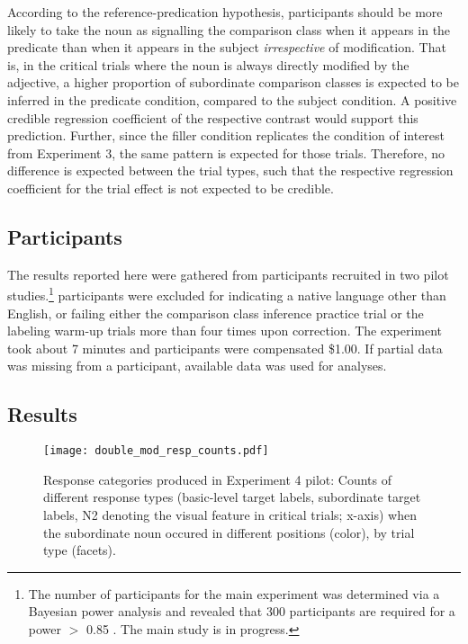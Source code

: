 
According to the reference-predication hypothesis, participants should be more likely to take the noun as signalling the comparison class when it appears in the predicate than when it appears in the subject \emph{irrespective} of modification. That is, in the critical trials where the noun is always directly modified by the adjective, a higher proportion of subordinate comparison classes is expected to be inferred in the predicate condition, compared to the subject condition. A positive credible regression coefficient of the respective contrast would support this prediction. Further, since the filler condition replicates the condition of interest from Experiment 3, the same pattern is expected for those trials. Therefore, no difference is expected between the trial types, such that the respective regression coefficient for the trial effect is not expected to be credible.     

\subsection{Participants}
The results reported here were gathered from  participants recruited in two pilot studies.\footnote{The number of participants for the main experiment was determined via a Bayesian power analysis and revealed that 300 participants are required for a power $>$ 0.85 \parencite{kruschke2014doing, powerKurz}. The main study is in progress.}  participants were excluded for indicating a native language other than English, or failing either the comparison class inference practice trial or the labeling warm-up trials more than four times upon correction. The experiment took about 7 minutes and participants were compensated \$1.00. If partial data was missing from a participant, available data was used for analyses.   
 
\subsection{Results}
\begin{figure*}[t]
	\begin{center}
		\texttt{[image: double\_mod\_resp\_counts.pdf]}
	\end{center}
	\vspace{-0.3cm}
	\caption{Response categories produced in Experiment 4 pilot: Counts of different response types (basic-level target labels, subordinate target labels, N2 denoting the visual feature in critical trials; x-axis) when the subordinate noun occured in different positions (color),  by trial type (facets).}
	\label{double-mod-resp-counts}
\end{figure*}

